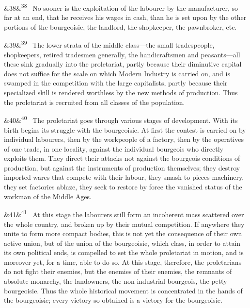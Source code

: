 \documentclass[12pt]{article}
\newcommand{\para}[1][]{\par\noindent\ifx&#1&\else\textsuperscript{\footnotesize #1}~\fi}
\begin{document}
\para[38] No sooner is the exploitation of the labourer by the manufacturer, so far at an end, that he receives his wages in cash, than he is set upon by the other portions of the bourgeoisie, the landlord, the shopkeeper, the pawnbroker, etc.

\para[39] The lower strata of the middle class---the small tradespeople, shopkeepers, retired tradesmen generally, the handicraftsmen and peasants---all these sink gradually into the proletariat, partly because their diminutive capital does not suffice for the scale on which Modern Industry is carried on, and is swamped in the competition with the large capitalists, partly because their specialized skill is rendered worthless by the new methods of production. Thus the proletariat is recruited from all classes of the population.

\para[40] The proletariat goes through various stages of development. With its birth begins its struggle with the bourgeoisie. At first the contest is carried on by individual labourers, then by the workpeople of a factory, then by the operatives of one trade, in one locality, against the individual bourgeois who directly exploits them. They direct their attacks not against the bourgeois conditions of production, but against the instruments of production themselves; they destroy imported wares that compete with their labour, they smash to pieces machinery, they set factories ablaze, they seek to restore by force the vanished status of the workman of the Middle Ages.

\para[41] At this stage the labourers still form an incoherent mass scattered over the whole country, and broken up by their mutual competition. If anywhere they unite to form more compact bodies, this is not yet the consequence of their own active union, but of the union of the bourgeoisie, which class, in order to attain its own political ends, is compelled to set the whole proletariat in motion, and is moreover yet, for a time, able to do so. At this stage, therefore, the proletarians do not fight their enemies, but the enemies of their enemies, the remnants of absolute monarchy, the landowners, the non-industrial bourgeois, the petty bourgeoisie. Thus the whole historical movement is concentrated in the hands of the bourgeoisie; every victory so obtained is a victory for the bourgeoisie.
\end{document}
